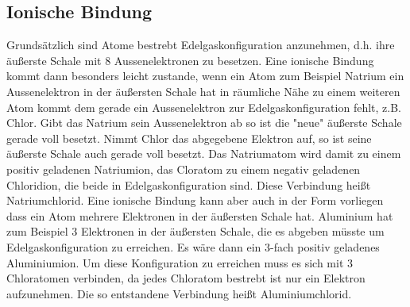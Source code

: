 	\subsection{Ionische Bindung}
	Grundsätzlich sind Atome bestrebt Edelgaskonfiguration anzunehmen, d.h. ihre äußerste Schale mit 8 Aussenelektronen zu besetzen. Eine ionische Bindung kommt dann besonders leicht zustande, wenn ein Atom zum Beispiel Natrium ein Aussenelektron in der äußersten Schale hat in räumliche Nähe zu einem weiteren Atom kommt dem gerade ein Aussenelektron zur Edelgaskonfiguration fehlt, z.B. Chlor. Gibt das Natrium sein Aussenelektron ab so ist die "neue" äußerste Schale gerade voll besetzt. Nimmt Chlor das abgegebene Elektron auf, so ist seine äußerste Schale auch gerade voll besetzt. Das Natriumatom wird damit zu einem positiv geladenen Natriumion, das Cloratom zu einem negativ geladenen Chloridion, die beide in Edelgaskonfiguration sind. Diese Verbindung heißt Natriumchlorid. Eine ionische Bindung kann aber auch in der Form vorliegen dass ein Atom mehrere Elektronen in der äußersten Schale hat. Aluminium hat zum Beispiel 3 Elektronen in der äußersten Schale, die es abgeben müsste um Edelgaskonfiguration zu erreichen. Es wäre dann ein 3-fach positiv geladenes Aluminiumion. Um diese Konfiguration zu erreichen muss es sich mit 3 Chloratomen verbinden, da jedes Chloratom bestrebt ist nur ein Elektron aufzunehmen. Die so entstandene Verbindung heißt Aluminiumchlorid.